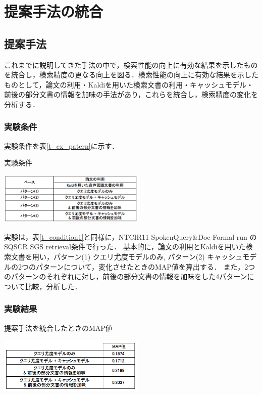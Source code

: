 \chapter{提案手法の統合}

\section{提案手法}

これまでに説明してきた手法の中で，検索性能の向上に有効な結果を示したものを統合し，検索精度の更なる向上を図る．検索性能の向上に有効な結果を示したものとして，論文の利用・Kaldiを用いた検索文書の利用・キャッシュモデル・前後の部分文書の情報を加味の手法があり，これらを統合し，検索精度の変化を分析する．

\subsection{実験条件}
実験条件を表\ref{t_ex_patern}に示す．

\begin{table}[h]
    \centering
    \caption{実験条件}
    \includegraphics[width=7cm]{./image/t_ex_patern.png}
    \label{t_ex_patern}
\end{table}
実験は，表\ref{t_condition1}と同様に，NTCIR11 SpokenQuery\&Doc Formal-run の SQSCR SGS retrieval条件で行った．
基本的に，論文の利用とKaldiを用いた検索文書を用い，パターン(1) クエリ尤度モデルのみ, パターン(2) キャッシュモデルの2つのパターンについて，変化させたときのMAP値を算出する．
また，2つのパターンのそれぞれに対し，前後の部分文書の情報を加味をした4パターンについて比較，分析した．

\subsection{実験結果}

\begin{table}[htbp]
    \centering
    \caption{提案手法を統合したときのMAP値}
    \includegraphics[width=7cm]{./image/t_integration.png}
    \label{t_integration}
\end{table}

